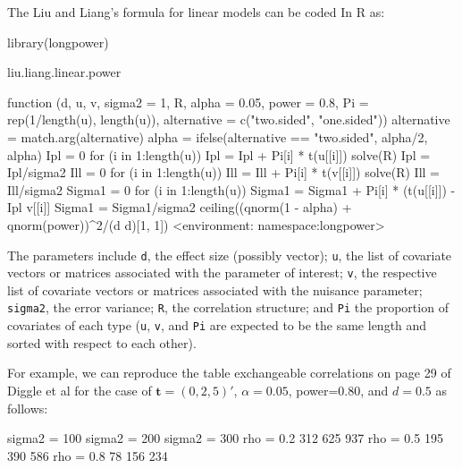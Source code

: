\documentclass[12pt]{article}
\begin{document}
The Liu and Liang's formula for linear models can be coded In R as:
\begin{Schunk}
\begin{Sinput}
 library(longpower)
\end{Sinput}
\end{Schunk}
\begin{Schunk}
\begin{Sinput}
 liu.liang.linear.power
\end{Sinput}
\begin{Soutput}
function (d, u, v, sigma2 = 1, R, alpha = 0.05, power = 0.8, 
    Pi = rep(1/length(u), length(u)), alternative = c("two.sided", 
        "one.sided")) 
{
    alternative = match.arg(alternative)
    alpha = ifelse(alternative == "two.sided", alpha/2, alpha)
    Ipl = 0
    for (i in 1:length(u)) Ipl = Ipl + Pi[i] * t(u[[i]]) %*% 
        solve(R) %*% v[[i]]
    Ipl = Ipl/sigma2
    Ill = 0
    for (i in 1:length(u)) Ill = Ill + Pi[i] * t(v[[i]]) %*% 
        solve(R) %*% v[[i]]
    Ill = Ill/sigma2
    Sigma1 = 0
    for (i in 1:length(u)) Sigma1 = Sigma1 + Pi[i] * (t(u[[i]]) - 
        Ipl %*% solve(Ill) %*% t(v[[i]])) %*% solve(R) %*% (u[[i]] - 
        v[[i]] %*% solve(Ill) %*% t(Ipl))
    Sigma1 = Sigma1/sigma2
    ceiling((qnorm(1 - alpha) + qnorm(power))^2/(d %*% Sigma1 %*% 
        d)[1, 1])
}
<environment: namespace:longpower>
\end{Soutput}
\end{Schunk}

The parameters include \texttt{d}, the effect size (possibly vector); \texttt{u}, the list of covariate vectors or matrices associated with the parameter of interest; \texttt{v}, the respective list of covariate vectors or matrices associated with the nuisance parameter; \texttt{sigma2}, the error variance; \texttt{R}, the correlation structure; and \texttt{Pi} the proportion of covariates of each type (\texttt{u}, \texttt{v}, and \texttt{Pi} are expected to be the same length and sorted with respect to each other).

For example, we can reproduce the table exchangeable correlations on page 29 of Diggle et al for the case of $\bm{t} = (0,2,5)'$, $\alpha=0.05$, power=0.80, and $d=0.5$ as follows:
\begin{Schunk}
\begin{Soutput}
          sigma2 = 100 sigma2 = 200 sigma2 = 300
rho = 0.2          312          625          937
rho = 0.5          195          390          586
rho = 0.8           78          156          234
\end{Soutput}
\end{Schunk}
\end{document}
